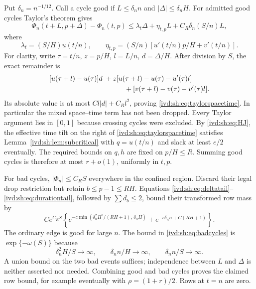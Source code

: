 \documentclass[11pt,letterpaper]{article}
\theoremstyle{remark}\newtheorem{remark}[theorem]{Remark}
\numberwithin{equation}{section}
\begin{document}
Put $\delta_n=n^{-1/12}$. Call a cycle good if
$L\le\delta_n n$ and $|\Delta|\le\delta_n H$.
For admitted good cycles Taylor's theorem gives
\begin{equation}\label{ivd:sh:eq:taylorspacetime}
 \Phi_n(t+L,p+\Delta)-\Phi_n(t,p)
 \le\lambda_t\Delta+\eta_{t,p}L+C_R\delta_n(S/n)L,
\end{equation}
where
\[
 \lambda_t=(S/H)u(t/n),\qquad
 \eta_{t,p}=(S/n)[u'(t/n)p/H+v'(t/n)].
\]
For clarity, write $\tau=t/n$, $z=p/H$, $l=L/n$, $d=\Delta/H$.
After division by $S$, the exact remainder is
\begin{align*}
 &[u(\tau+l)-u(\tau)]d\;+
 z[u(\tau+l)-u(\tau)-u'(\tau)l]\\
 &\hspace{38mm}+[v(\tau+l)-v(\tau)-v'(\tau)l].
\end{align*}
Its absolute value is at most $Cl|d|+C_Rl^2$, proving
\eqref{ivd:sh:eq:taylorspacetime}. In particular the mixed space--time term
has not been dropped. Every Taylor argument lies in $[0,1]$ because
crossing cycles were excluded.
By \eqref{ivd:sh:eq:HJ}, the effective time tilt on the right of
\eqref{ivd:sh:eq:taylorspacetime} satisfies Lemma~\ref{ivd:sh:lem:subcritical}
with $q=u(t/n)$ and slack at least $e/2$ eventually. The required
bounds on $q,h$ are fixed on $p/H\le R$. Summing good cycles is
therefore at most $r+o(1)$, uniformly in $t,p$.

For bad cycles, $|\Phi_n|\le C_RS$ everywhere in the confined region.
Discard their legal drop restriction but retain $b\le p-1\le RH$.
Equations \eqref{ivd:sh:eq:deltatail}--\eqref{ivd:sh:eq:durationtail}, followed
by $\sum d_b\le2$, bound their transformed row mass by
\begin{equation}\label{ivd:sh:eq:badcycles}
 Ce^{C_RS}\left\{
  e^{-c\min(\delta_n^2H^2/(RH+1),\,\delta_n H)}
   +e^{-c\delta_n n+C(RH+1)}\right\}.
\end{equation}
The ordinary edge is good for large $n$. The bound in
\eqref{ivd:sh:eq:badcycles} is $\exp\{-\omega(S)\}$ because
\[
 \delta_n^2H/S\to\infty,\qquad
 \delta_n n/H\to\infty,\qquad\delta_n n/S\to\infty.
\]
A union bound on the two bad events suffices; independence between
$L$ and $\Delta$ is neither asserted nor needed. Combining good and
bad cycles proves the claimed row bound, for example eventually with
$\rho=(1+r)/2$. Rows at $t=n$ are zero.
\end{document}
